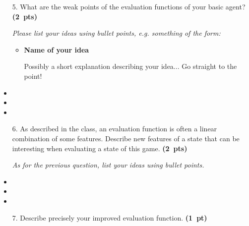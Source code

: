\documentclass[11pt,a4paper]{report}
\begin{document}
\begin{enumerate}
\item[5.] What are the weak points of the evaluation functions of your basic agent? \textbf{(2~pts)}

{\it Please list your ideas using bullet points, e.g.\! something of the form:
	\begin{itemize}
	\item \textbf{Name of your idea}
	
	Possibly a short explanation describing your idea... Go straight to the point!
	\end{itemize}}
\end{enumerate}

\begin{answers}[17cm]

\begin{itemize}
\item %
\item
\item
\end{itemize}

\end{answers}


\clearpage
\begin{enumerate}
\item[6.] As described in the class, an evaluation function is often a linear combination of
some features. Describe new features of a state that can be interesting when evaluating a state of this game. \textbf{(2~pts)}

\textit{As for the previous question, list your ideas using bullet points.}
\end{enumerate}

\begin{answers}[20cm]

\begin{itemize}
\item %
\item
\item
\end{itemize}

\end{answers}



\clearpage
\begin{enumerate}
\item[7.] Describe precisely your improved evaluation function. \textbf{(1~pt)}
\end{enumerate}
\end{document}
